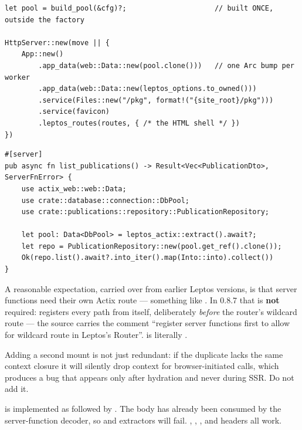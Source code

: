 \begin{lstlisting}[style=rs,caption={The wiring, in \file{main.rs}.}]
let pool = build_pool(&cfg)?;                     // built ONCE, outside the factory

HttpServer::new(move || {
    App::new()
        .app_data(web::Data::new(pool.clone()))   // one Arc bump per worker
        .app_data(web::Data::new(leptos_options.to_owned()))
        .service(Files::new("/pkg", format!("{site_root}/pkg")))
        .service(favicon)
        .leptos_routes(routes, { /* the HTML shell */ })
})
\end{lstlisting}

\begin{lstlisting}[style=rs,caption={And reading it back, in \file{src/publications/api.rs}.}]
#[server]
pub async fn list_publications() -> Result<Vec<PublicationDto>, ServerFnError> {
    use actix_web::web::Data;
    use crate::database::connection::DbPool;
    use crate::publications::repository::PublicationRepository;

    let pool: Data<DbPool> = leptos_actix::extract().await?;
    let repo = PublicationRepository::new(pool.get_ref().clone());
    Ok(repo.list().await?.into_iter().map(Into::into).collect())
}
\end{lstlisting}

\begin{why}
A reasonable expectation, carried over from earlier Leptos versions, is that server functions need
their own Actix route --- something like
. In
 0.8.7 that is \textbf{not} required:  registers every
path from  itself, deliberately \emph{before} the
router's wildcard route --- the source carries the comment ``register server functions first to
allow for wildcard route in Leptos's Router''.  is literally
.

Adding a second mount is not just redundant: if the duplicate lacks the same context closure it
will silently drop context for browser-initiated calls, which produces a bug that appears only
after hydration and never during SSR. Do not add it.
\end{why}

\begin{pitfall}
 is implemented as  followed by
. The body has already been consumed by the server-function decoder, so
 and  extractors will fail. ,
, ,  and headers all work.
\end{pitfall}

